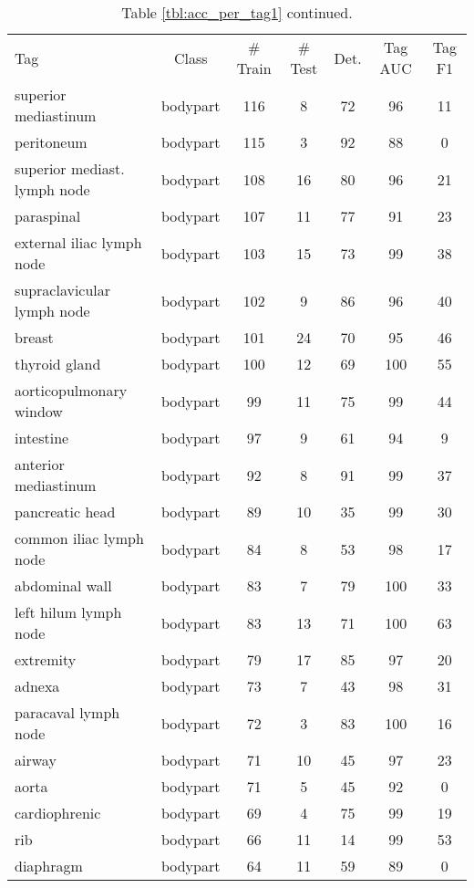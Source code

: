 \documentclass[runningheads]{llncs}
\begin{document}
\begin{table}[]
	\centering
	\scriptsize
	\setlength{\tabcolsep}{5pt}
	\renewcommand{\arraystretch}{1.2}
	\caption{Table \ref{tbl:acc_per_tag1} continued.}
	\begin{tabular}{p{3.6cm}cccccc}
		\hline
		Tag	& Class	& \# Train	& \# Test	& Det.	& Tag AUC	& Tag F1 \\
		superior mediastinum	&  bodypart	& 116	& 8	& 72	& 96	& 11 \\
		peritoneum	&  bodypart	& 115	& 3	& 92	& 88	& 0 \\
		superior mediast. lymph node	&  bodypart	& 108	& 16	& 80	& 96	& 21 \\
		paraspinal	&  bodypart	& 107	& 11	& 77	& 91	& 23 \\
		external iliac lymph node	&  bodypart	& 103	& 15	& 73	& 99	& 38 \\
		supraclavicular lymph node	&  bodypart	& 102	& 9	& 86	& 96	& 40 \\
		breast	&  bodypart	& 101	& 24	& 70	& 95	& 46 \\
		thyroid gland	&  bodypart	& 100	& 12	& 69	& 100	& 55 \\
		aorticopulmonary window	&  bodypart	& 99	& 11	& 75	& 99	& 44 \\
		intestine	&  bodypart	& 97	& 9	& 61	& 94	& 9 \\
		anterior mediastinum	&  bodypart	& 92	& 8	& 91	& 99	& 37 \\
		pancreatic head	&  bodypart	& 89	& 10	& 35	& 99	& 30 \\
		common iliac lymph node	&  bodypart	& 84	& 8	& 53	& 98	& 17 \\
		abdominal wall	&  bodypart	& 83	& 7	& 79	& 100	& 33 \\
		left hilum lymph node	&  bodypart	& 83	& 13	& 71	& 100	& 63 \\
		extremity	&  bodypart	& 79	& 17	& 85	& 97	& 20 \\
		adnexa	&  bodypart	& 73	& 7	& 43	& 98	& 31 \\
		paracaval lymph node	&  bodypart	& 72	& 3	& 83	& 100	& 16 \\
		airway	&  bodypart	& 71	& 10	& 45	& 97	& 23 \\
		aorta	&  bodypart	& 71	& 5	& 45	& 92	& 0 \\
		cardiophrenic	&  bodypart	& 69	& 4	& 75	& 99	& 19 \\
		rib	&  bodypart	& 66	& 11	& 14	& 99	& 53 \\
		diaphragm	&  bodypart	& 64	& 11	& 59	& 89	& 0 \\

\end{tabular}
\end{table}
\end{document}
